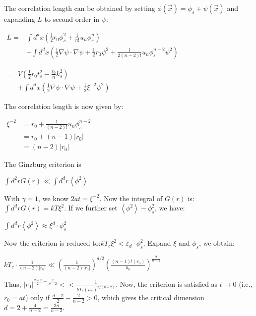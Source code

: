 \documentclass[12pt,titlepage]{article}
\numberwithin{equation}{section}
\begin{document}
The correlation length can be obtained by setting $\phi(\vec{x})=\phi_{s}+\psi(\vec{x})$ and expanding $L$ to second order in $\psi$:

$\begin{aligned} L=& \int d^{d} x\left(\frac{1}{2} r_{0} \phi_{s}^{2}+\frac{1}{n !} u_{n} \phi_{s}^{n}\right) \\ &+\int d^{d} x\left(\frac{1}{2} \nabla \psi \cdot \nabla \psi+\frac{1}{2} r_{0} \psi^{2}+\frac{1}{2(n-2)!} u_{n} \phi_{s}^{n-2} \psi^{2}\right) \end{aligned}$

$\begin{aligned}=& V\left(\frac{1}{2} r_{0} t_{s}^{2}-\frac{r_{0}}{n} k_{s}^{2}\right) \\ &+\int d^{d} x\left(\frac{1}{2} \nabla \psi \cdot \nabla \psi+\frac{1}{2} \xi^{-2} \psi^{2}\right) \end{aligned}$

The correlation length is now given by:

$\begin{aligned} \xi^{-2} &=r_{0}+\frac{1}{(n-2) !} u_{n} \phi_{s}^{n-2} \\ &=r_{0}+(n-1)\left|r_{0}\right| \\ &=(n-2)\left|r_{0}\right| \end{aligned}$

The Ginzburg criterion is

$\int d^{2} r G(r)\ll \int d^{d} r\left\langle\phi^{2}\right\rangle$

With $\gamma=1$, we know $2 a t=\xi^{-2}$. Now the integral of $G(r)$ is:$\int d^{d} r G(r)=k T \xi^{2}$. If we further set $\left\langle \phi^{2}\right\rangle-\phi_{s}^{2}$, we have:

$\int d^{d} r\left\langle\phi^{2}\right\rangle \approx \xi^{d} \cdot \phi_{s}^{2}$

Now the criterion is reduced to:$k T_{c} \xi^{2}<\varepsilon_{d} \cdot \phi_{s}^{2}$. Expand $\xi$ and $\phi_s$, we obtain:

$k T_{c} \cdot \frac{1}{(n-2)\left|r_{0}\right|}\ll\left(\frac{1}{(n-2)\left|r_{0}\right|}\right)^{d / 2}\left(\frac{(n-1) !(r_0)}{u_{n}}\right)^{\frac{2}{n-2}}$

Thus, $\left|r_{0}\right|^{\frac{d-2}{2}-\frac{2}{n-2}}<<\frac{1}{k T_{c}\left(u_{n}\right)^{2 /(n-2)}}$. Now, the criterion is satisfied as $t\rightarrow 0$ (i.e., $r_0=at$) only if $\frac{d-2}{2}-\frac{2}{n-2}>0$, which gives the critical dimension $d=2+\frac{4}{n-2}=\frac{2n}{n-2}$.
\end{document}
